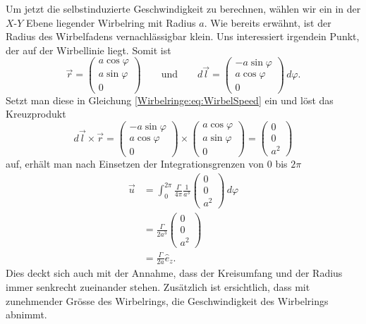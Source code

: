 Um jetzt die selbstinduzierte Geschwindigkeit zu berechnen, wählen wir ein in der \(X\)-\(Y\) Ebene liegender Wirbelring mit Radius \(a\).
Wie bereits erwähnt, ist der Radius des Wirbelfadens vernachlässigbar klein.
Uns interessiert irgendein Punkt, der auf der Wirbellinie liegt.
Somit ist
\[
\vec{r} = 
\begin{pmatrix}
    a \cos \varphi\\
    a \sin \varphi\\
    0    
\end{pmatrix}
\qquad
\text{und}
\qquad
d\vec{l} = 
\begin{pmatrix}
    -a \sin \varphi\\
    a \cos \varphi\\
    0    
\end{pmatrix}
\,d\varphi .
\] 
Setzt man diese in Gleichung \eqref{Wirbelringe:eq:WirbelSpeed} ein und löst das Kreuzprodukt 
\[
d\vec{l}\times\vec{r} 
= 
\begin{pmatrix}
    -a \sin \varphi\\
    a \cos \varphi\\
    0
\end{pmatrix}
\times
\begin{pmatrix}
    a \cos \varphi\\
    a \sin \varphi\\
    0    
\end{pmatrix}
=
\begin{pmatrix}
    0\\
    0\\
    a^2
\end{pmatrix}
\]
auf, erhält man nach Einsetzen der Integrationsgrenzen von 0 bis \(2\pi\)
\begin{align*}
\vec{u}
&=
\int_{0}^{2\pi} \frac{\Gamma}{4\pi}\frac{1}{a^3}
\begin{pmatrix}
    0\\
    0\\
    a^2
\end{pmatrix}
\,d\varphi\\
&=\frac{\Gamma}{2a^3}
\begin{pmatrix}
    0\\
    0\\
    a^2
\end{pmatrix}\\
&=\frac{\Gamma}{2a}\hat{e}_z.
\end{align*}    
Dies deckt sich auch mit der Annahme, dass der Kreisumfang und der Radius immer senkrecht zueinander stehen.
Zusätzlich ist ersichtlich, dass mit zunehmender Grösse des Wirbelrings, die Geschwindigkeit des Wirbelrings abnimmt.

